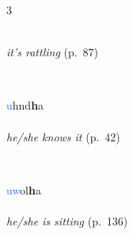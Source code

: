 \documentclass[oneside,openany]{book}%
\begin{document}
\begin{multicols}{3}
\begin{minipage}[t]{\linewidth}
\\
\noindent \textit{it's rattling} (p.~87)
\end{minipage}\\[1em]%
\begin{minipage}[t]{\linewidth}
\raggedright\noindent \textcolor{RoyalBlue}{u}hnd\textbf{h}a\\
\\
\noindent \textit{he/she knows it} (p.~42)
\end{minipage}\\[1em]%
\begin{minipage}[t]{\linewidth}
\raggedright\noindent \textcolor{RoyalBlue}{uw}ol\textbf{h}a\\
\\
\noindent \textit{he/she is sitting} (p.~136)
\end{minipage}\\[1em]%
\end{multicols}%
\vspace{1em}%
\needspace{1.5in}%
\end{document}
